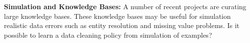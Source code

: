 \vspace{0.5em}
\noindent \textbf{Simulation and Knowledge Bases: } A number of recent projects are curating large knowledge bases. These knowledge bases may be useful for simulation realistic data errors such as entity resolution and missing value problems. Is it possible to learn a data cleaning policy from simulation of examples?


